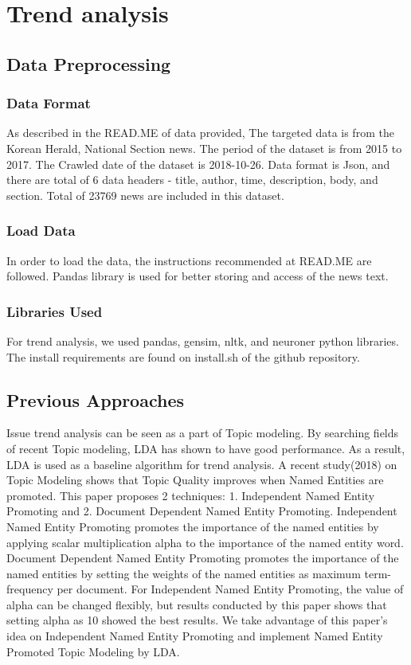 \section{Trend analysis}

\subsection{Data Preprocessing}
\subsubsection{Data Format}
As described in the READ.ME of data provided, The targeted data is from the Korean Herald, National Section news. The period of the dataset is from 2015 to 2017. The Crawled date of the dataset is 2018-10-26. Data format is Json, and there are total of 6 data headers - title, author, time, description, body, and section. Total of 23769 news are included in this dataset.

\subsubsection{Load Data}
In order to load the data, the instructions recommended at READ.ME are followed. Pandas library is used for better storing and access of the news text.
\subsubsection{Libraries Used}
For trend analysis, we used pandas, gensim, nltk, and neuroner python libraries. The install requirements are found on install.sh of the github repository.


\subsection{Previous Approaches}
Issue trend analysis can be seen as a part of Topic modeling. By searching fields of recent Topic modeling, LDA has shown to have good performance. As a result, LDA is used as a baseline algorithm for trend analysis.
A recent study(2018) on Topic Modeling shows that Topic Quality improves when Named Entities are promoted.\cite{krasnashchok-jouili-2018-improving} This paper proposes 2 techniques: 1. Independent Named Entity Promoting and 2. Document Dependent Named Entity Promoting. Independent Named Entity Promoting promotes the importance of the named entities by applying scalar multiplication alpha to the importance of the named entity word. Document Dependent Named Entity Promoting promotes the importance of the named entities by setting the weights of the named entities as maximum term-frequency per document. For Independent Named Entity Promoting, the value of alpha can be changed flexibly, but results conducted by this paper shows that setting alpha as 10 showed the best results.
We take advantage of this paper's idea on Independent Named Entity Promoting and implement Named Entity Promoted Topic Modeling by LDA.
